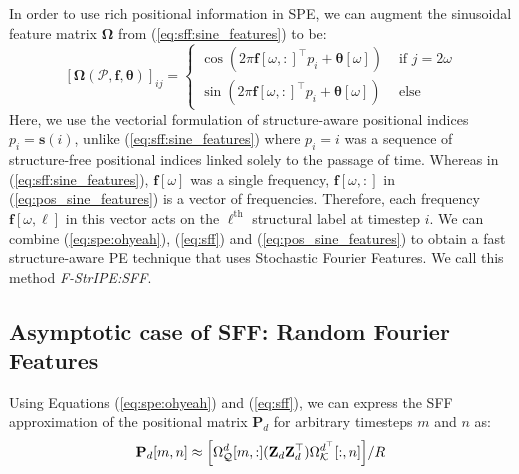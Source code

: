 In order to use rich positional information in SPE, we can augment the sinusoidal feature matrix $\boldsymbol{\Omega}$ from (\ref{eq:sff:sine_features}) to be:
\begin{equation} \label{eq:pos_sine_features}
    [\boldsymbol{\Omega}(\mathcal{P}, \boldsymbol{f}, \boldsymbol{\theta})]_{i j}= \begin{cases}\cos \left(2 \pi \mathbf{f}[\omega, :]^\top p_i+\boldsymbol{\theta}[\omega]\right) & \text { if } j = 2\omega \\ \sin \left(2 \pi \mathbf{f}[\omega, :]^\top p_i+\boldsymbol{\theta}[\omega] \right) & \text { else }\end{cases}
\end{equation}
Here, we use the vectorial formulation of structure-aware positional indices $p_i = \mathbf{s}(i)$, unlike (\ref{eq:sff:sine_features}) where $p_i = i$ was a sequence of structure-free positional indices linked solely to the passage of time. Whereas in (\ref{eq:sff:sine_features}), $\mathbf{f}[\omega]$ was a single frequency, $\mathbf{f}[\omega, :]$ in (\ref{eq:pos_sine_features}) is a vector of frequencies. Therefore, each frequency $\mathbf{f}[\omega, \ell]$ in this vector acts on the $\ell^{\text{th}}$ structural label at timestep $i$. We can combine (\ref{eq:spe:ohyeah}), (\ref{eq:sff}) and (\ref{eq:pos_sine_features}) to obtain a fast structure-aware PE technique that uses Stochastic Fourier Features. We call this method \textit{F-StrIPE:SFF}.


\subsection{Asymptotic case of SFF: Random Fourier Features} \label{ssection:asymptotic_rff}

Using Equations (\ref{eq:spe:ohyeah}) and (\ref{eq:sff}), we can express the SFF approximation of the positional matrix $\mathbf{P}_d$ for arbitrary timesteps $m$ and $n$ as:
\begin{equation} \label{eq:sff_mn}
    \mathbf{P}_d[m, n] \approx \Big[ \Omega_\mathcal{Q}^d [m, :] (\mathbf{Z}_d \mathbf{Z}_d^\top) \Omega_\mathcal{K}^{d^\top} [:, n] \Big] / R \\
\end{equation}

